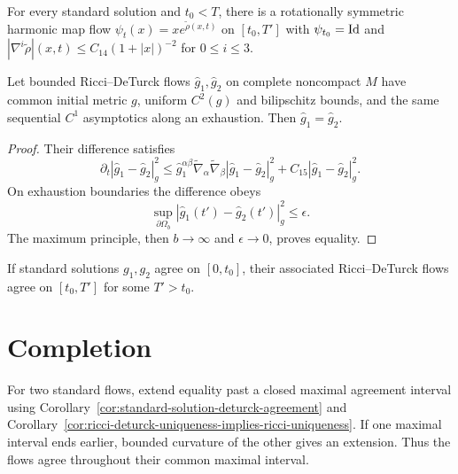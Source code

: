 \begin{proposition}
\label{prop:harmonic-map-flow-existence-decay}
\label{harmapflow}

For every standard solution and $t_0<T$, there is a rotationally symmetric
harmonic map flow $\psi_t(x)=xe^{\tilde\rho(x,t)}$ on $[t_0,T']$ with
$\psi_{t_0}=\operatorname{Id}$ and $|\nabla^i\tilde\rho|(x,t)\le C_{14}(1+|x|)^{-2}$
for $0\le i\le3$.
\end{proposition}

\begin{proposition}
\label{prop:ricci-deturck-uniqueness-noncompact}
\label{RDuniq}

Let bounded Ricci--DeTurck flows $\hat g_1,\hat g_2$ on complete noncompact
$M$ have common initial metric $g$, uniform $C^2(g)$ and bilipschitz bounds,
and the same sequential $C^1$ asymptotics along an exhaustion. Then
$\hat g_1=\hat g_2$.
\end{proposition}
\begin{proof}
\sketch Their difference satisfies
\begin{equation}\label{eqestforunique}
 \partial_t|\hat g_1-\hat g_2|_g^2\le\hat g_1^{\alpha\beta}\tilde\nabla_\alpha\tilde\nabla_\beta|\hat g_1-\hat g_2|_g^2+C_{15}|\hat g_1-\hat g_2|_g^2.
\end{equation}
On exhaustion boundaries the difference obeys
\begin{equation}\label{eq est for uniq
bddy}
\sup_{\partial\Omega_b}|\hat g_1(t')-\hat g_2(t')|_g^2\le\epsilon.
\end{equation}
The maximum principle, then $b\to\infty$ and $\epsilon\to0$, proves equality.
\end{proof}

\begin{corollary}
\label{cor:standard-solution-deturck-agreement}
\label{duniq}

If standard solutions $g_1,g_2$ agree on $[0,t_0]$, their associated
Ricci--DeTurck flows agree on $[t_0,T']$ for some $T'>t_0$.
\end{corollary}

\section{Completion}
For two standard flows, extend equality past a closed maximal agreement
interval using Corollary~\ref{cor:standard-solution-deturck-agreement} and
Corollary~\ref{cor:ricci-deturck-uniqueness-implies-ricci-uniqueness}. If one
maximal interval ends earlier, bounded curvature of the other gives an
extension. Thus the flows agree throughout their common maximal interval.

